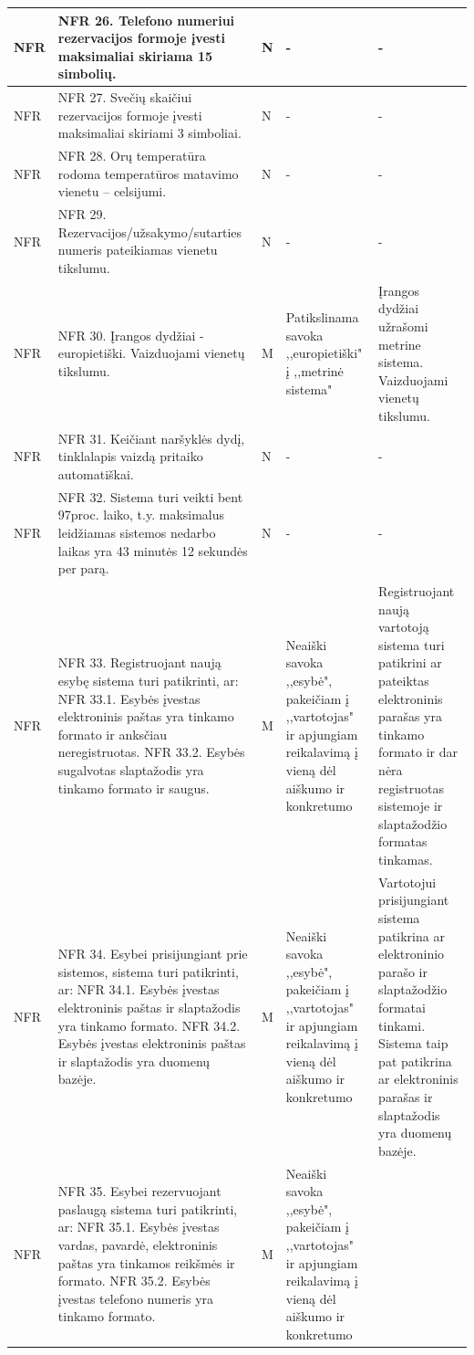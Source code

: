 \documentclass[oneside]{VUMIFPSkursinis}
\begin{document}
\begin{longtable}{ | p{}|p{}|p{}|p{}|p{}| }
NFR & NFR 26. Telefono numeriui rezervacijos formoje įvesti maksimaliai skiriama 15 simbolių. & N & - & - \\ \hline
NFR & NFR 27. Svečių skaičiui rezervacijos formoje įvesti maksimaliai skiriami 3 simboliai. & N & - & - \\ \hline
NFR & NFR 28. Orų temperatūra rodoma temperatūros matavimo vienetu – celsijumi.  & N & - & - \\ \hline
NFR & NFR 29. Rezervacijos/užsakymo/sutarties numeris pateikiamas vienetu tikslumu. & N & - & - \\ \hline
NFR & NFR 30. Įrangos dydžiai - europietiški. Vaizduojami vienetų tikslumu.  & M & Patikslinama savoka ,,europietiški" į ,,metrinė sistema" &  Įrangos dydžiai užrašomi metrine sistema. Vaizduojami vienetų tikslumu. \\ \hline
NFR & NFR 31. Keičiant naršyklės dydį, tinklalapis vaizdą pritaiko automatiškai. & N & - & - \\ \hline
NFR & NFR 32. Sistema turi veikti bent 97proc. laiko, t.y. maksimalus leidžiamas sistemos nedarbo laikas yra 43 minutės 12 sekundės per parą. & N & - & - \\ \hline
NFR & NFR 33. Registruojant naują esybę sistema turi patikrinti, ar: 
  NFR 33.1. Esybės įvestas elektroninis paštas yra tinkamo formato ir anksčiau neregistruotas. 
 NFR 33.2. Esybės sugalvotas slaptažodis yra tinkamo formato ir saugus. & M & Neaiški savoka ,,esybė", pakeičiam į ,,vartotojas" ir apjungiam reikalavimą į vieną dėl aiškumo ir konkretumo & Registruojant naują vartotoją sistema turi patikrini ar pateiktas elektroninis parašas yra tinkamo formato ir dar nėra registruotas sistemoje ir slaptažodžio formatas tinkamas. \\ \hline
NFR & NFR 34. Esybei prisijungiant prie sistemos, sistema turi patikrinti, ar: 
 NFR 34.1. Esybės įvestas elektroninis paštas ir slaptažodis yra tinkamo formato. 
 NFR 34.2. Esybės įvestas elektroninis paštas ir slaptažodis yra duomenų bazėje. & M
& Neaiški savoka ,,esybė", pakeičiam į ,,vartotojas" ir apjungiam reikalavimą į vieną dėl aiškumo ir konkretumo & Vartotojui prisijungiant sistema patikrina ar elektroninio parašo ir slaptažodžio formatai tinkami. Sistema taip pat patikrina ar elektroninis parašas ir slaptažodis yra duomenų bazėje. \\ \hline
NFR & NFR 35. Esybei rezervuojant paslaugą sistema turi patikrinti, ar: 
NFR 35.1. Esybės įvestas vardas, pavardė, elektroninis paštas yra tinkamos reikšmės ir formato. 
NFR 35.2. Esybės įvestas telefono numeris yra tinkamo formato. & M & Neaiški savoka ,,esybė", pakeičiam į ,,vartotojas" ir apjungiam reikalavimą į vieną dėl aiškumo ir konkretumo & 

\end{longtable}
\end{document}
